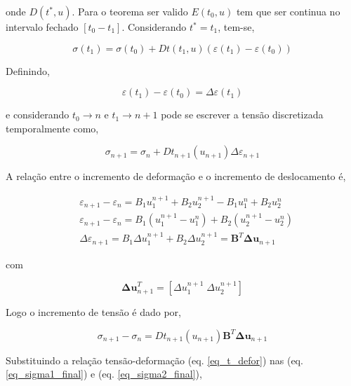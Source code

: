 \documentclass[12pt,a4paper]{article}
\begin{document}
\noindent
onde $D\left(t^*,u\right)$. Para o teorema ser valido $E(t_0, u)$ tem que ser continua no intervalo fechado $[t_0-t_1]$. Considerando  $t^*=t_1$, tem-se,

\begin{equation}
\sigma\left(t_1\right) = \sigma\left(t_0\right) + Dt\left(t_1,u\right) \left(\varepsilon(t_1) - \varepsilon(t_0)\right)
\end{equation}

Definindo,

\begin{equation}
\varepsilon(t_1) - \varepsilon(t_0) = \Delta\varepsilon(t_1)
\end{equation}

\noindent
e considerando $t_0 \rightarrow  n$ e $t_1 \rightarrow  n + 1$ pode se escrever a tensão discretizada temporalmente como,

\begin{equation}
\sigma_{n + 1} = \sigma_{n} + Dt_{n+1}\left(u_{n+1}\right) \Delta\varepsilon_{n+1}
\end{equation}

A relação entre o incremento de deformação e o incremento de deslocamento é,

\begin{align}
&\varepsilon_{n+1} - \varepsilon_{n} = B_1 u_1^{n+1} + B_2 u_2^{n+1} - B_1 u_1^{n} + B_2 u_2^{n}\\
&\varepsilon_{n+1} - \varepsilon_{n} = B_1(u_1^{n+1} - u_1^{n}) + B_2 ( u_2^{n+1} - u_2^{n})\\
&\Delta \varepsilon_{n+1} = B_1 \Delta u_1^{n+1} + B_2 \Delta u_2^{n+1} = \mathbf{B}^T \mathbf{\Delta u}_{n+1}
\end{align}

\noindent
com

\begin{equation}
\mathbf{\Delta u}^T_{n+1} = [\Delta u_1^{n+1}\;\Delta u_2^{n+1}]
\end{equation}

\noindent
Logo o incremento de tensão é dado por,

\begin{equation}
\sigma_{n + 1} - \sigma_{n} = Dt_{n+1}\left(u_{n+1}\right) \mathbf{B}^T \mathbf{\Delta u}_{n+1}
\label{inc_tensao}
\end{equation}


Substituindo a relação tensão-deformação (eq. \ref{eq_t_defor}) nas  (eq. \ref{eq_sigma1_final}) e (eq. \ref{eq_sigma2_final}), 
\end{document}
